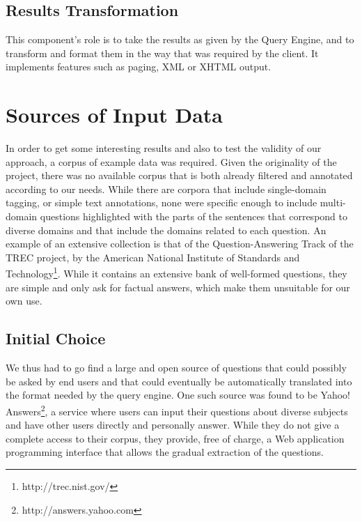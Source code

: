 \subsection{Results Transformation} %
\label{sub:results_transformation}
This component's role is to take the results as given by the Query Engine, and to transform and format them in the way that was required by the client. It implements features such as paging, XML or XHTML output.


\section{Sources of Input Data} %
\label{sec:sources_of_input_data}

In order to get some interesting results and also to test the validity of our approach, a corpus of example data was required. Given the originality of the project, there was no available corpus that is both already filtered and annotated according to our needs. While there are corpora that include single-domain tagging, or simple text annotations, none were specific enough to include multi-domain questions highlighted with the parts of the sentences that correspond to diverse domains and that include the domains related to each question. An example of an extensive collection is that of the Question-Answering Track of the TREC project, by the American National Institute of Standards and Technology\footnote{http://trec.nist.gov/}. While it contains an extensive bank of well-formed questions, they are simple and only ask for factual answers, which make them unsuitable for our own use.

\subsection{Initial Choice} %
\label{sub:initial_choice}

We thus had to go find a large and open source of questions that could possibly be asked by end users and that could eventually be automatically translated into the format needed by the query engine. One such source was found to be Yahoo! Answers\footnote{http://answers.yahoo.com}, a service where users can input their questions about diverse subjects and have other users directly and personally answer. While they do not give a complete access to their corpus, they provide, free of charge, a Web application programming interface that allows the gradual extraction of the questions.

